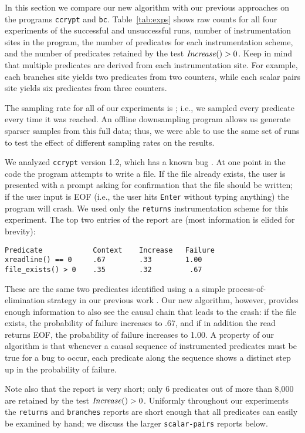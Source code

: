 


In this section we compare our new algorithm with our previous
approaches on the programs {\tt ccrypt} and {\tt bc}.
Table~\ref{tab:exps} shows raw counts for all four experiments of the
successful and unsuccessful runs, number of instrumentation sites in
the program, the number of predicates for each
instrumentation scheme, and the number of predicates retained by the
test $\mbox{\textit{Increase}}() > 0$.   Keep in mind that multiple predicates are
derived from each instrumentation site.  For example, each branches
site yields two predicates from two counters, while each scalar pairs
site yields six predicates from three counters.

The sampling rate for all of our experiments is ;
i.e., we sampled every predicate every time it was reached.  An
offline downsampling program allows us generate sparser samples from this
full data; thus, we were able to use the same set of runs to test the
effect of different sampling rates on the results.  

We analyzed {\tt ccrypt} version 1.2, which has a known bug \cite{Selinger:2003:cqual}.  At one point in the code the program attempts to write a file.  If the file already exists, the user is presented with a prompt asking for confirmation that the file should be written; if the user input is EOF (i.e., the user hits {\tt Enter} without typing anything) the program will crash.  We used only the {\tt returns}
instrumentation scheme for this experiment. The top
two entries of the report are (most information is elided for
brevity):
\begin{verbatim}
Predicate            Context    Increase   Failure
xreadline() == 0     .67        .33        1.00
file_exists() > 0    .35        .32         .67
\end{verbatim}

These are the same two predicates identified using a a simple process-of-elimination strategy in our previous work
\cite{PLDI`03*141}.  Our new algorithm, however, provides enough information to also see the causal chain that
leads to the crash: if the file exists, the probability of failure increases to .67, and if in addition the
read returns EOF, the probability of failure increases to 1.00.  A property of our algorithm is that 
whenever a causal sequence of instrumented predicates must be true for a bug to occur, each predicate along the
sequence shows a distinct step up in the probability of failure.

Note also that the report is very short; only 6 predicates out of more than 8,000 are retained by the test $\mbox{\textit{Increase}}() > 0$.
Uniformly throughout our experiments the {\tt returns} and {\tt branches} reports are short enough that all predicates can
easily be examined by hand; we discuss the larger {\tt scalar-pairs} reports below.


